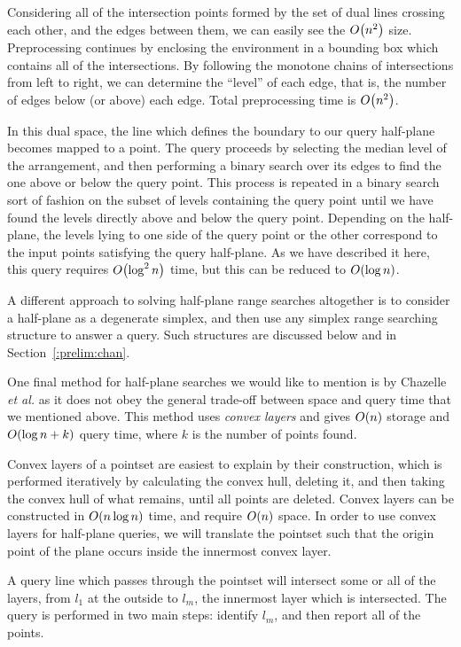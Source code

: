 Considering all of the intersection points formed by the set of dual lines crossing each other, and the edges between them, we can easily see the $O\!\left(n^2\right)$ size.
Preprocessing continues by enclosing the environment in a bounding box which contains all of the intersections.
By following the monotone chains of intersections from left to right, we can determine the ``level'' of each edge, that is, the number of edges below (or above) each edge.
Total preprocessing time is $O\!\left(n^2\right)$.

In this dual space, the line which defines the boundary to our query half-plane becomes mapped to a point.
The query proceeds by selecting the median level of the arrangement, and then performing a binary search over its edges to find the one above or below the query point.
This process is repeated in a binary search sort of fashion on the subset of levels containing the query point until we have found the levels directly above and below the query point. 
Depending on the half-plane, the levels lying to one side of the query point or the other correspond to the input points satisfying the query half-plane.
As we have described it here, this query requires $O\!\left(\log^2{n}\right)$ time, but this can be reduced to $O\!\left(\log{n}\right)$.\cite{NandyDG03}

A different approach to solving half-plane range searches altogether is to consider a half-plane as a degenerate simplex, and then use any simplex range searching structure to answer a query.  
Such structures are discussed below and in Section~\ref{:prelim:chan}.

One final method for half-plane searches we would like to mention is by Chazelle \emph{et al.}\cite{ChazelleGL85,Chazelle85} as it does not obey the general trade-off between space and query time that we mentioned above.
This method uses \emph{convex layers} and gives $O\!\left(n\right)$ storage and $O\!\left(\log{n} + k\right)$ query time, where $k$ is the number of points found. 

Convex layers of a pointset are easiest to explain by their construction, which is performed iteratively by calculating the convex hull, deleting it, and then taking the convex hull of what remains, until all points are deleted.
Convex layers can be constructed in $O\!\left(n\log{n}\right)$ time, and require $O\!\left(n\right)$ space.
In order to use convex layers for half-plane queries, we will translate the pointset such that the origin point of the plane occurs inside the innermost convex layer.

A query line which passes through the pointset will intersect some or all of the layers, from $l_1$ at the outside to $l_m$, the innermost layer which is intersected.
The query is performed in two main steps: identify $l_m$, and then report all of the points.

